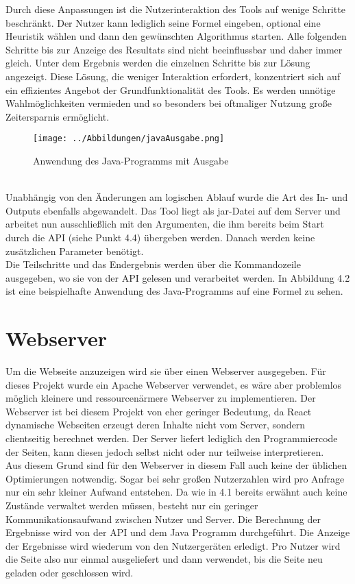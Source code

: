Durch diese Anpassungen ist die Nutzerinteraktion des Tools auf wenige Schritte beschränkt. Der Nutzer kann lediglich seine Formel eingeben, optional eine Heuristik wählen und dann den gewünschten Algorithmus starten. Alle folgenden Schritte bis zur Anzeige des Resultats sind nicht beeinflussbar und daher immer gleich. Unter dem Ergebnis werden die einzelnen Schritte bis zur Lösung angezeigt. Diese Lösung, die weniger Interaktion erfordert, konzentriert sich auf ein effizientes Angebot der Grundfunktionalität des Tools. Es werden unnötige Wahlmöglichkeiten vermieden und so besonders bei oftmaliger Nutzung große Zeitersparnis ermöglicht.\\
\begin{figure}[htb]
     \centerline{\texttt{[image: ../Abbildungen/javaAusgabe.png]}}
  \caption{Anwendung des Java-Programms mit Ausgabe}
  \label{fig1_1}
\end{figure}\\
Unabhängig von den Änderungen am logischen Ablauf wurde die Art des In- und Outputs ebenfalls abgewandelt. Das Tool liegt als jar-Datei auf dem Server und  arbeitet nun ausschließlich mit den Argumenten, die ihm bereits beim Start durch die API (siehe Punkt 4.4) übergeben werden. Danach werden keine zusätzlichen Parameter benötigt. \\
Die Teilschritte und das Endergebnis werden über die Kommandozeile ausgegeben, wo sie von der API gelesen und verarbeitet werden. In Abbildung 4.2 ist eine beispielhafte Anwendung des Java-Programms auf eine Formel zu sehen.\\

\section{Webserver}
Um die Webseite anzuzeigen wird sie über einen Webserver ausgegeben. Für dieses Projekt wurde ein Apache Webserver verwendet, es wäre aber problemlos möglich kleinere und ressourcenärmere Webserver zu implementieren. Der Webserver ist bei diesem Projekt von eher geringer Bedeutung, da React dynamische Webseiten erzeugt deren Inhalte nicht vom Server, sondern clientseitig berechnet werden. Der Server liefert lediglich den Programmiercode der Seiten, kann diesen jedoch selbst nicht oder nur teilweise interpretieren. \\
Aus diesem Grund sind für den Webserver in diesem Fall auch keine der üblichen Optimierungen notwendig. Sogar bei sehr großen Nutzerzahlen wird pro Anfrage nur ein sehr kleiner Aufwand entstehen. Da wie in 4.1 bereits erwähnt auch keine Zustände verwaltet werden müssen, besteht nur ein geringer Kommunikationsaufwand zwischen Nutzer und Server. Die Berechnung der Ergebnisse wird von der API und dem Java Programm durchgeführt. Die Anzeige der Ergebnisse wird wiederum von den Nutzergeräten erledigt. Pro Nutzer wird die Seite also nur einmal ausgeliefert und dann verwendet, bis die Seite neu geladen oder geschlossen wird.
